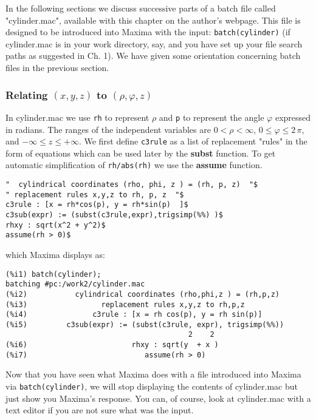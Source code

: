 \documentclass[12pt]{article}
\begin{document}
\smallskip

In the following sections we discuss successive parts of a batch file called
  "cylinder.mac", available with this chapter on the author's webpage.
This file is designed to be introduced into Maxima with the input: \verb|batch(cylinder)| 
  (if cylinder.mac is in your work directory, say, and you have set up your file search
  paths as suggested in Ch. 1).
We have given some orientation concerning batch files in the previous section.

\subsubsection*{Relating $(x,y,z)$ to $(\rho,\varphi,z)$}
In cylinder.mac we use \verb|rh| to represent $\rho$ and \verb|p| to represent
 the angle $\varphi$  expressed in radians.
The ranges of the independent variables are $ 0 < \rho < \infty$,
  $0 \leq \varphi \leq 2\,\pi$, and $-\infty \leq z \leq +\infty$. 
We first define \verb|c3rule| as a list of replacement "rules"
  in the form of equations which can be used later by the \textbf{subst} function.
To get automatic simplification of \verb|rh/abs(rh)| we use the \textbf{assume}
 function.  
\small
\begin{verbatim}
"  cylindrical coordinates (rho, phi, z ) = (rh, p, z)  "$   
" replacement rules x,y,z to rh, p, z  "$
c3rule : [x = rh*cos(p), y = rh*sin(p)  ]$
c3sub(expr) := (subst(c3rule,expr),trigsimp(%%) )$
rhxy : sqrt(x^2 + y^2)$
assume(rh > 0)$
\end{verbatim}
\normalsize
which Maxima displays as:
\small
\begin{verbatim}
(%i1) batch(cylinder);
batching #pc:/work2/cylinder.mac
(%i2)           cylindrical coordinates (rho,phi,z ) = (rh,p,z)  
(%i3)                 replacement rules x,y,z to rh,p,z  
(%i4)               c3rule : [x = rh cos(p), y = rh sin(p)]
(%i5)         c3sub(expr) := (subst(c3rule, expr), trigsimp(%%))
                                          2    2
(%i6)                        rhxy : sqrt(y  + x )
(%i7)                           assume(rh > 0)
\end{verbatim}
\normalsize
Now that you have seen what Maxima does with a file introduced into Maxima
 via \verb|batch(cylinder)|, we will stop displaying the contents of cylinder.mac
 but just show you Maxima's response.
You can, of course, look at cylinder.mac with a text editor if you are not sure
  what was the input.
\end{document}
